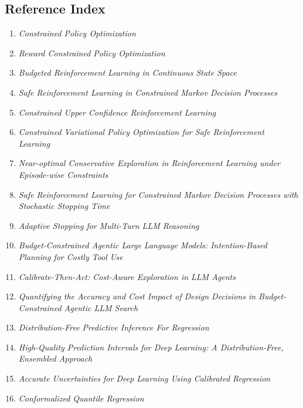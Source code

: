 \subsection{Reference Index}
\label{sec:related-work-reference-index}

\begin{enumerate}
\item \emph{Constrained Policy Optimization}~\cite{achiam2017constrained}
\item \emph{Reward Constrained Policy Optimization}~\cite{tessler2019reward}
\item \emph{Budgeted Reinforcement Learning in Continuous State Space}~\cite{carrara2019budgeted}
\item \emph{Safe Reinforcement Learning in Constrained Markov Decision Processes}~\cite{wachi2020safe}
\item \emph{Constrained Upper Confidence Reinforcement Learning}~\cite{zheng2020constrained}
\item \emph{Constrained Variational Policy Optimization for Safe Reinforcement Learning}~\cite{liu2022constrainedvariational}
\item \emph{Near-optimal Conservative Exploration in Reinforcement Learning under Episode-wise Constraints}~\cite{li2023nearoptimal}
\item \emph{Safe Reinforcement Learning for Constrained Markov Decision Processes with Stochastic Stopping Time}~\cite{mazumdar2024safe}
\item \emph{Adaptive Stopping for Multi-Turn LLM Reasoning}~\cite{zhou2026adaptive}
\item \emph{Budget-Constrained Agentic Large Language Models: Intention-Based Planning for Costly Tool Use}~\cite{liu2026budgetconstrained}
\item \emph{Calibrate-Then-Act: Cost-Aware Exploration in LLM Agents}~\cite{ding2026calibratethenact}
\item \emph{Quantifying the Accuracy and Cost Impact of Design Decisions in Budget-Constrained Agentic LLM Search}~\cite{mccleary2026quantifying}
\item \emph{Distribution-Free Predictive Inference For Regression}~\cite{lei2018distributionfree}
\item \emph{High-Quality Prediction Intervals for Deep Learning: A Distribution-Free, Ensembled Approach}~\cite{pearce2018highquality}
\item \emph{Accurate Uncertainties for Deep Learning Using Calibrated Regression}~\cite{kuleshov2018accurate}
\item \emph{Conformalized Quantile Regression}~\cite{romano2019conformalized}

\end{enumerate}
